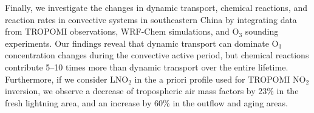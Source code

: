 {Finally, we investigate the changes in dynamic transport, chemical reactions, and reaction rates in convective systems in southeastern China by integrating data from TROPOMI observations, WRF-Chem simulations, and O$_3$ sounding experiments.
Our findings reveal that dynamic transport can dominate O$_3$ concentration changes during the convective active period,
but chemical reactions contribute 5--10 times more than dynamic transport over the entire lifetime.
Furthermore, if we consider LNO$_2$ in the a priori profile used for TROPOMI NO$_2$ inversion, we observe a decrease of tropospheric air mass factors by 23\% in the fresh lightning area, and an increase by 60\% in the outflow and aging areas.
}
